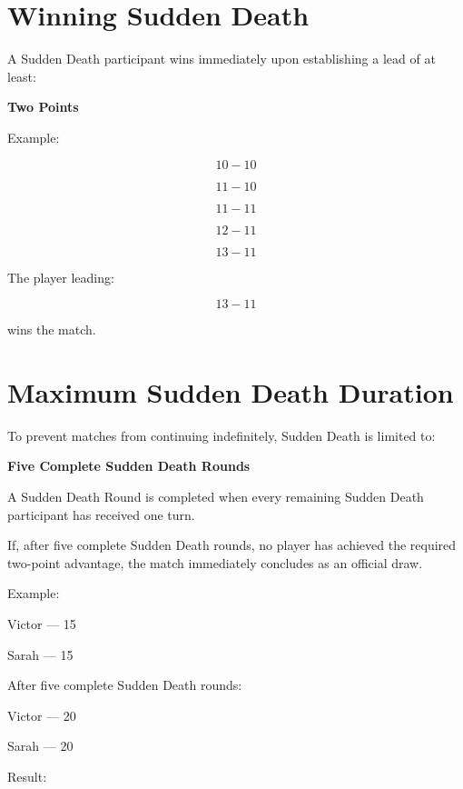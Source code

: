 \documentclass[11pt,a4paper]{article}
\begin{document}
\section{Winning Sudden Death}

A Sudden Death participant wins immediately upon establishing a lead of at least:

\begin{center}
\Large\textbf{Two Points}
\end{center}

Example:

\[
10-10
\]

\[
11-10
\]

\[
11-11
\]

\[
12-11
\]

\[
13-11
\]

The player leading:

\[
13-11
\]

wins the match.

\section{Maximum Sudden Death Duration}

To prevent matches from continuing indefinitely, Sudden Death is limited to:

\begin{center}
\Large\textbf{Five Complete Sudden Death Rounds}
\end{center}

A Sudden Death Round is completed when every remaining Sudden Death participant has received one turn.

If, after five complete Sudden Death rounds, no player has achieved the required two-point advantage, the match immediately concludes as an official draw.

Example:

\begin{center}
Victor --- 15

Sarah --- 15
\end{center}

After five complete Sudden Death rounds:

\begin{center}
Victor --- 20

Sarah --- 20
\end{center}

Result:
\end{document}
